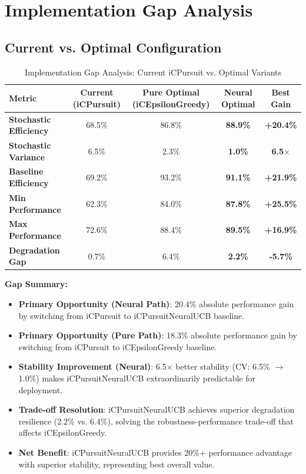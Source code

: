 \documentclass[12pt,a4paper]{article}
\newcommand{\primarytext}[1]{\textcolor{primaryblue}{\textbf{#1}}}
\newcommand{\success}[1]{\textcolor{accentgreen}{\textbf{#1}}}
\newcommand{\warning}[1]{\textcolor{warningred}{\textbf{#1}}}
\newcommand{\neural}[1]{\textcolor{neuralcolor}{\textbf{#1}}}
\begin{document}
\section{Implementation Gap Analysis}

\subsection{Current vs. Optimal Configuration}

\begin{table}[H]
\small
\centering
\caption{Implementation Gap Analysis: Current iCPursuit vs. Optimal Variants}
\label{tab:implementation-gap}
\begin{tabular}{@{}lcccc@{}}\toprule
\textbf{Metric} & \textbf{Current (iCPursuit)} & \textbf{Pure Optimal (iCEpsilonGreedy)} & \textbf{Neural Optimal} & \textbf{Best Gain} \\\midrule
\warning{Stochastic Efficiency} & 68.5\% & 86.8\% & \neural{88.9\%} & \neural{+20.4\%} \\
\warning{Stochastic Variance} & 6.5\% & 2.3\% & \neural{1.0\%} & \neural{6.5$\times$} \\
\warning{Baseline Efficiency} & 69.2\% & 93.2\% & \neural{91.1\%} & \neural{+21.9\%} \\
\warning{Min Performance} & 62.3\% & 84.0\% & \neural{87.8\%} & \neural{+25.5\%} \\
\warning{Max Performance} & 72.6\% & 88.4\% & \neural{89.5\%} & \neural{+16.9\%} \\\midrule
\warning{Degradation Gap} & 0.7\% & 6.4\% & \neural{2.2\%} & \neural{-5.7\%} \\\bottomrule
\end{tabular}
\end{table}

\textbf{Gap Summary:}
\begin{itemize}
\item \neural{Primary Opportunity (Neural Path)}: 20.4\% absolute performance gain by switching from iCPursuit to iCPursuitNeuralUCB baseline.
\item \primarytext{Primary Opportunity (Pure Path)}: 18.3\% absolute performance gain by switching from iCPursuit to iCEpsilonGreedy baseline.
\item \neural{Stability Improvement (Neural)}: 6.5$\times$ better stability (CV: 6.5\% $\rightarrow$ 1.0\%) makes iCPursuitNeuralUCB extraordinarily predictable for deployment.
\item \warning{Trade-off Resolution}: iCPursuitNeuralUCB achieves superior degradation resilience (2.2\% vs. 6.4\%), solving the robustness-performance trade-off that affects iCEpsilonGreedy.
\item \success{Net Benefit}: iCPursuitNeuralUCB provides 20\%+ performance advantage with superior stability, representing best overall value.
\end{itemize}
\end{document}
